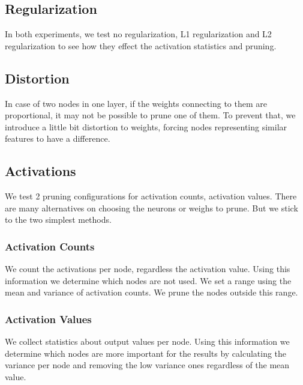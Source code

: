 \subsection{Regularization}
In both experiments, we test no regularization, L1 regularization and L2 regularization to see how they effect the activation statistics and pruning.

\subsection{Distortion}
In case of two nodes in one layer, if the weights connecting to them are proportional, it may not be possible to prune one of them. To prevent that, we introduce a little bit distortion to weights, forcing nodes representing similar features to have a difference. 

\subsection{Activations}
We test 2 pruning configurations for activation counts, activation values. There are many alternatives on choosing the neurons or weighs to prune. But we stick to the two simplest methods.

\subsubsection{Activation Counts}
We count the activations per node, regardless the activation value. Using this information we determine which nodes are not used. We set a range using the mean and variance of activation counts. We prune the nodes outside this range.

\subsubsection{Activation Values}
We collect statistics about output values per node. Using this information we determine which nodes are more important for the results by calculating the variance per node and removing the low variance ones regardless of the mean value.

